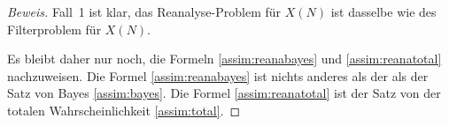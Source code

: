 \begin{proof}[Beweis]
Fall~1 ist klar, das Reanalyse-Problem für $X(N)$ ist dasselbe wie des
Filterproblem für $X(N)$.

Es bleibt daher nur noch, die Formeln
\eqref{assim:reanabayes}
und
\eqref{assim:reanatotal}
nachzuweisen.
Die Formel
\eqref{assim:reanabayes}
ist nichts anderes als der 
als der Satz von Bayes
\eqref{assim:bayes}.
Die Formel 
\eqref{assim:reanatotal}
ist der Satz von der totalen Wahrscheinlichkeit
\eqref{assim:total}.
\end{proof}






